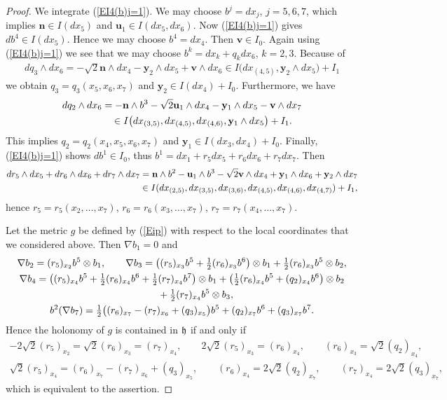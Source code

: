 \documentclass[pdftex]{sigma}
\numberwithin{equation}{section}
\newcommand\fh{{\frak h}}
\newcommand\bu{{\mathbf u}}
\newcommand\by{{\mathbf y}}
\newcommand\bn{{\mathbf n}}
\newcommand\bv{{\mathbf v}}
\begin{document}
\begin{proof} We integrate (\ref{EI4(b)j=1}). We may choose $b^j=dx_j$, $j=5,6,7$, which implies $\bn\in I(dx_5)$ and $\bu_1\in I(dx_5, dx_6)$. Now (\ref{EI4(b)j=1}) gives $db^4\in I(dx_5)$. Hence we may choose $b^4=dx_4$. Then $\bv\in I_0$. Again using (\ref{EI4(b)j=1}) we see that we may choose $b^k=dx_k+q_k dx_6$, $k=2,3$. Because of
\begin{gather*} dq_3\wedge dx_6=-\sqrt 2 \bn\wedge dx_4 -\by_2\wedge dx_5 +\bv\wedge dx_6\in I\big(dx_{(4,5)}, \by_2\wedge dx_5\big) +I_1\end{gather*}
we obtain $q_3=q_3(x_5,x_6,x_7)$ and $\by_2\in I(dx_4)+I_0$. Furthermore, we have
\begin{gather*}
 dq_2\wedge dx_6 =-\bn\wedge b^3-\sqrt 2 \bu_1\wedge dx_4 -\by_1\wedge dx_5 -\bv\wedge dx_7\\
\hphantom{dq_2\wedge dx_6}{} \in I\big(dx_{(3,5)},dx_{(4,5)},dx_{(4,6)}, \by_1\wedge dx_5\big) +I_1.
 \end{gather*}
This implies $q_2=q_2(x_4,x_5,x_6,x_7)$ and $\by_1\in I(dx_3,dx_4)+I_0$. Finally, (\ref{EI4(b)j=1}) shows $db^1\in I_0$, thus $b^1= dx_1 + r_5dx_5+r_6dx_6+r_7dx_7$. Then
\begin{gather*}
dr_5\wedge dx_5+dr_6\wedge dx_6+dr_7\wedge dx_7 = \bn\wedge b^2 -\bu_1\wedge b^3 - \sqrt 2 \bv\wedge dx_4+\by_1\wedge dx_6+\by_2\wedge dx_7\\
\hphantom{dr_5\wedge dx_5+dr_6\wedge dx_6+dr_7\wedge dx_7}{} \in I(dx_{(2,5)}, dx_{(3,5)}, dx_{(3,6)}, dx_{(4,5)}, dx_{(4,6)}, dx_{(4,7)}) +I_1,
\end{gather*}
hence $r_5=r_5(x_2,\dots, x_7)$, $r_6=r_6(x_3,\dots,x_7)$, $r_7=r_7(x_4,\dots,x_7)$.

Let the metric $g$ be defined by (\ref{Eip}) with respect to the local coordinates that we considered above. Then $\nabla b_1=0$ and
\begin{gather*}
\nabla b_2 = (r_5)_{x_2} b^5\otimes b_1,\qquad
\nabla b_3 = \big((r_5)_{x_3}b^5+\tfrac12 (r_6)_{x_3}b^6\big)\otimes b_1+\tfrac12 (r_6)_{x_3}b^5\otimes b_2,\\
\nabla b_4 = \big( (r_5)_{x_4}b^5+ \tfrac12 (r_6)_{x_4}b^6+\tfrac12 (r_7)_{x_4}b^7\big)\otimes b_1 + \big(\tfrac12 (r_6)_{x_4}b^5+(q_2)_{x_4} b^6\big)\otimes b_2\\
\hphantom{\nabla b_4 =}{} + \tfrac12 (r_7)_{x_4} b^5\otimes b_3,\\
b^2(\nabla b_7) = \tfrac12 \big( (r_6)_{x_7}-(r_7)_{x_6}+(q_3)_{x_5} \big)b^5+ (q_2)_{x_7}b^6 +(q_3)_{x_7}b^7.
\end{gather*}
Hence the holonomy of $g$ is contained in $\fh$ if and only if
\begin{gather*}
-2\sqrt2(r_5)_{x_2} =\sqrt2(r_6)_{x_3}=(r_7)_{x_4}, \qquad
{2\sqrt2}(r_5)_{x_3} =(r_6)_{x_4},\qquad (r_6)_{x_3}= {\sqrt2}(q_2)_{x_4}, \\
\sqrt2 (r_5)_{x_4} = (r_6)_{x_7}-(r_7)_{x_6}+(q_3)_{x_5},\qquad (r_6)_{x_4}=2\sqrt2 (q_2)_{x_7},\qquad (r_7)_{x_4}=2\sqrt2 (q_3)_{x_7},
\end{gather*}
which is equivalent to the assertion.
\end{proof}
\end{document}
